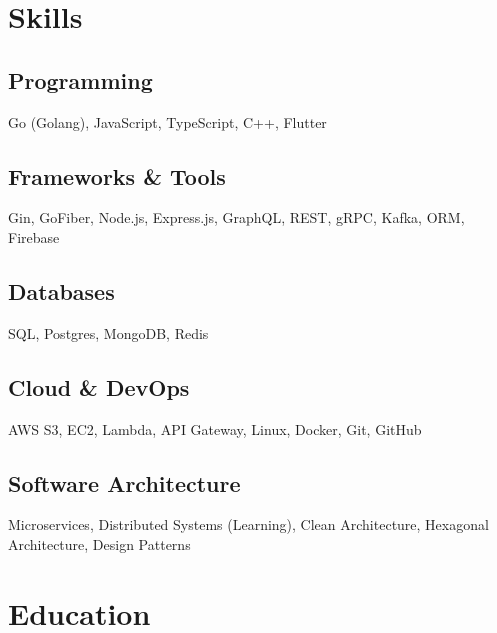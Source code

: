 \documentclass[]{deedy-resume-reversed}
\begin{document}
\begin{minipage}[t]{0.33\textwidth}


\section{Skills}
\subsection{Programming}
\vspace{0.1cm}
Go (Golang), JavaScript, TypeScript, C++, Flutter  \\

\subsection{Frameworks \& Tools}
\vspace{0.1cm}
Gin, GoFiber, Node.js, Express.js, GraphQL, REST, gRPC,  Kafka, ORM, Firebase \\

\subsection{Databases}
\vspace{0.1cm}
SQL, Postgres, MongoDB, Redis \\

\subsection{Cloud \& DevOps}
\vspace{0.1cm}
AWS S3, EC2, Lambda, API Gateway, Linux, Docker, Git, GitHub \\

\subsection{Software Architecture}
\vspace{0.1cm}
Microservices, Distributed Systems (Learning), Clean Architecture, Hexagonal Architecture, Design Patterns
\vspace{0.5cm}
\section{Education}

\end{minipage}
\end{document}

